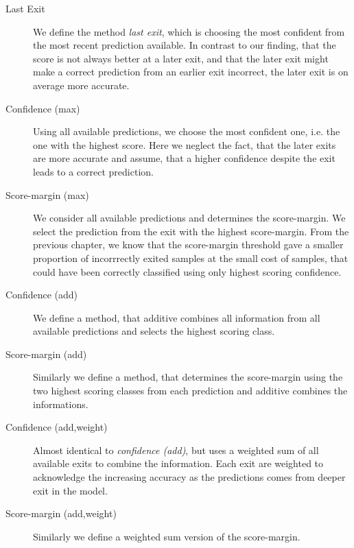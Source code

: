 \begin{description}
	\item[Last Exit] We define the method \emph{last exit}, which is choosing the most confident from the most recent prediction available. In contrast to our finding, that the score is not always better at a later exit, and that the later exit might make a correct prediction from an earlier exit incorrect, the later exit is on average more accurate.
	\item[Confidence (max)] Using all available predictions, we choose the most confident one, i.e. the one with the highest score. Here we neglect the fact, that the later exits are more accurate and assume, that a higher confidence despite the exit leads to a correct prediction.
	\item[Score-margin (max)] We consider all available predictions and determines the score-margin. We select the prediction from the exit with the highest score-margin. From the previous chapter, we know that the score-margin threshold gave a smaller proportion of incorrrectly exited samples at the small cost of samples, that could have been correctly classified using only highest scoring confidence.
	\item[Confidence (add)] We define a method, that additive combines all information from all available predictions and selects the highest scoring class. 
	\item[Score-margin (add)] Similarly we define a method, that determines the score-margin using the two highest scoring classes from each prediction and additive combines the informations.
	\item[Confidence (add,weight)] Almost identical to \emph{confidence (add)}, but uses a weighted sum of all available exits to combine the information. Each exit are weighted to acknowledge the increasing accuracy as the predictions comes from deeper exit in the model.  
	\item[Score-margin (add,weight)] Similarly we define a weighted sum version of the score-margin. 
\end{description}

